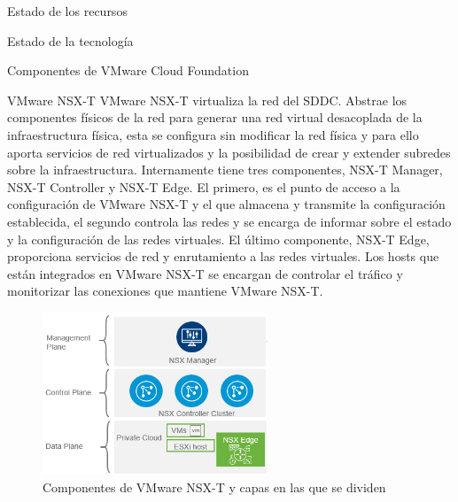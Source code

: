 \begin{chapter}{Estado de los recursos}
\begin{section}{Estado de la tecnología}
\begin{subsection}{Componentes de VMware Cloud Foundation}
\begin{subsubsection}{VMware NSX-T}
    VMware NSX-T virtualiza la red del SDDC. Abstrae los componentes físicos de la red para generar una red virtual desacoplada de la infraestructura física, esta se configura sin modificar la red física y para ello aporta servicios de red virtualizados y la posibilidad de crear y extender subredes sobre la infraestructura. Internamente tiene tres componentes, NSX-T Manager, NSX-T Controller y NSX-T Edge. El primero, es el punto de acceso a la configuración de VMware NSX-T y el que almacena y transmite la configuración establecida, el segundo controla las redes y se encarga de informar sobre el estado y la configuración de las redes virtuales. El último componente, NSX-T Edge, proporciona servicios de red y enrutamiento a las redes virtuales. Los hosts que están integrados en VMware NSX-T se encargan de controlar el tráfico y monitorizar las conexiones que mantiene VMware NSX-T.
    \begin{figure}[h!]
        \centering
            \includegraphics[width=0.6\textwidth]{imaxes/VCF-componentes/nsx-t-layers.png}
            \caption{Componentes de VMware NSX-T y capas en las que se dividen}
            \label{fig:nsx-t-components}
        \end{figure}
        \FloatBarrier
\end{subsubsection}


\end{subsection}
\end{section}
\end{chapter}
